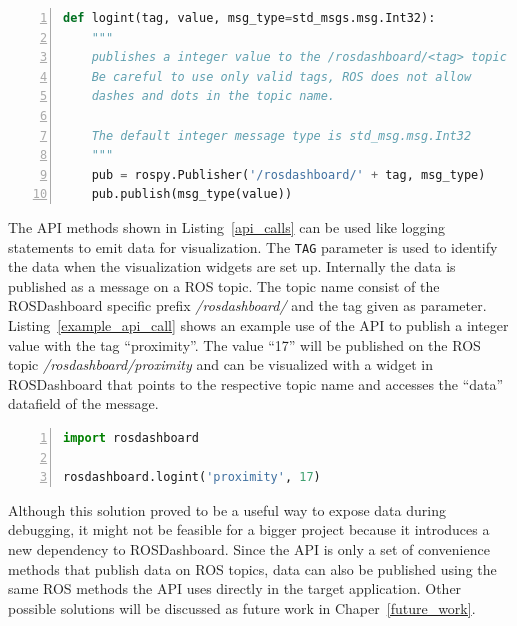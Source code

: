 \begin{lstlisting}[float,frame=single,caption={Implemented logint API method.},label=api_implementation,language=Python,numbers=left,breaklines=true]
def logint(tag, value, msg_type=std_msgs.msg.Int32):
    """
    publishes a integer value to the /rosdashboard/<tag> topic
    Be careful to use only valid tags, ROS does not allow
    dashes and dots in the topic name.
    
    The default integer message type is std_msg.msg.Int32
    """
    pub = rospy.Publisher('/rosdashboard/' + tag, msg_type)
    pub.publish(msg_type(value))
\end{lstlisting}

The API methods shown in Listing~\ref{api_calls} can be used like logging statements to emit data for visualization. The \verb+TAG+ parameter is used to identify the data when the visualization widgets are set up. Internally the data is published as a message on a ROS topic. The topic name consist of the ROSDashboard specific prefix \emph{/rosdashboard/} and the tag given as parameter. Listing~\ref{example_api_call} shows an example use of the API to publish a integer value with the tag ``proximity''. The value ``17'' will be published on the ROS topic \emph{/rosdashboard/proximity} and can be visualized with a widget in ROSDashboard that points to the respective topic name and accesses the ``data'' datafield of the message.

\vspace{1em}
\begin{lstlisting}[frame=single,caption={Example API usage.},label=example_api_call,language=Python,numbers=left,breaklines=true]
import rosdashboard

rosdashboard.logint('proximity', 17)
\end{lstlisting}

Although this solution proved to be a useful way to expose data during debugging, it might not be feasible for a bigger project because it introduces a new dependency to ROSDashboard. Since the API is only a set of convenience methods that publish data on ROS topics, data can also be published using the same ROS methods the API uses directly in the target application. Other possible solutions will be discussed as future work in Chaper~\ref{future_work}.

